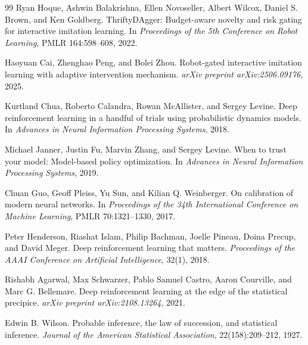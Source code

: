 \begin{thebibliography}{99}
Ryan Hoque, Ashwin Balakrishna, Ellen Novoseller, Albert Wilcox, Daniel S. Brown, and Ken Goldberg.
\newblock ThriftyDAgger: Budget-aware novelty and risk gating for interactive imitation learning.
\newblock In \emph{Proceedings of the 5th Conference on Robot Learning}, PMLR 164:598--608, 2022.

Haoyuan Cai, Zhenghao Peng, and Bolei Zhou.
\newblock Robot-gated interactive imitation learning with adaptive intervention mechanism.
\newblock \emph{arXiv preprint arXiv:2506.09176}, 2025.

Kurtland Chua, Roberto Calandra, Rowan McAllister, and Sergey Levine.
\newblock Deep reinforcement learning in a handful of trials using probabilistic dynamics models.
\newblock In \emph{Advances in Neural Information Processing Systems}, 2018.

Michael Janner, Justin Fu, Marvin Zhang, and Sergey Levine.
\newblock When to trust your model: Model-based policy optimization.
\newblock In \emph{Advances in Neural Information Processing Systems}, 2019.

Chuan Guo, Geoff Pleiss, Yu Sun, and Kilian Q. Weinberger.
\newblock On calibration of modern neural networks.
\newblock In \emph{Proceedings of the 34th International Conference on Machine Learning}, PMLR 70:1321--1330, 2017.

Peter Henderson, Riashat Islam, Philip Bachman, Joelle Pineau, Doina Precup, and David Meger.
\newblock Deep reinforcement learning that matters.
\newblock \emph{Proceedings of the AAAI Conference on Artificial Intelligence}, 32(1), 2018.

Rishabh Agarwal, Max Schwarzer, Pablo Samuel Castro, Aaron Courville, and Marc G. Bellemare.
\newblock Deep reinforcement learning at the edge of the statistical precipice.
\newblock \emph{arXiv preprint arXiv:2108.13264}, 2021.

Edwin B. Wilson.
\newblock Probable inference, the law of succession, and statistical inference.
\newblock \emph{Journal of the American Statistical Association}, 22(158):209--212, 1927.

\end{thebibliography}
